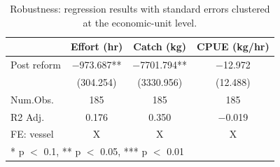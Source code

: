 \begin{table}
\centering
\caption{\label{tab:eucluster}Robustness: regression results with standard errors clustered at the economic-unit level.}
\centering
\begin{tabular}[t]{lccc}
\toprule
  & Effort (hr) & Catch (kg) & CPUE (kg/hr)\\
\midrule
Post reform & \num{-973.687}** & \num{-7701.794}** & \num{-12.972}\\
 & (\num{304.254}) & (\num{3330.956}) & (\num{12.488})\\
\midrule
Num.Obs. & \num{185} & \num{185} & \num{185}\\
R2 Adj. & \num{0.176} & \num{0.350} & \num{-0.019}\\
FE: vessel & X & X & X\\
\bottomrule
\multicolumn{4}{l}{\rule{0pt}{1em}* p $<$ 0.1, ** p $<$ 0.05, *** p $<$ 0.01}\\
\end{tabular}
\end{table}
